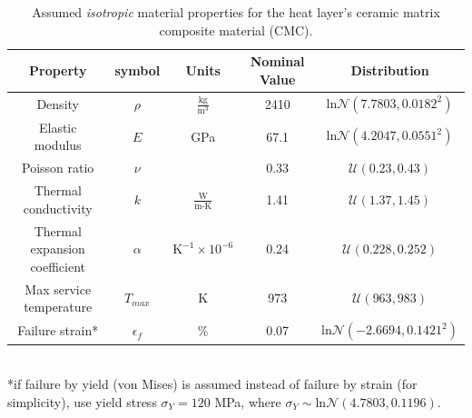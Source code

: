 \documentclass{article}
\begin{document}
\begin{table}
\caption[CMC material properties]{Assumed \textit{isotropic} material properties for the heat layer's ceramic matrix composite material (CMC).}
\label{tab:matPropCMC}
\begin{center}
\begin{tabular}[]{ c | c | c | c | c }
\textbf{Property} & \textbf{symbol} & \textbf{Units} & \textbf{Nominal Value} & \textbf{Distribution} \\ \hline
Density & $\rho$ & $\frac{\textrm{kg}}{\textrm{m}^3}$ & 2410 & $\textrm{ln}\mathcal{N}(7.7803,0.0182^2)$ \\ \hline
Elastic modulus & $E$ & GPa & 67.1 & $\textrm{ln}\mathcal{N}(4.2047,0.0551^2)$ \\ \hline
Poisson ratio & $\nu$ & & 0.33 & $\mathcal{U}(0.23,0.43)$\\ \hline
Thermal conductivity & $k$ & $\frac{\textrm{W}}{\textrm{m-K}}$ & 1.41 & $\mathcal{U}(1.37,1.45)$ \\ \hline
Thermal expansion coefficient & $\alpha$ & $\textrm{K}^{-1} \times 10^{-6}$ & 0.24 & $\mathcal{U}(0.228,0.252)$ \\ \hline \hline
Max service temperature & $T_{max}$ & K & 973 & $\mathcal{U}(963,983)$ \\ \hline
Failure strain* & $\epsilon_{f}$ & \% & 0.07 & $\textrm{ln}\mathcal{N}(-2.6694,0.1421^2)$ \\ \hline
\end{tabular} \\
*if failure by yield (von Mises) is assumed instead of failure by strain (for simplicity), use yield stress $\sigma_Y = 120$ MPa, where $\sigma_Y \sim \textrm{ln}\mathcal{N}(4.7803,0.1196)$.
\end{center}
\end{table}
\end{document}
